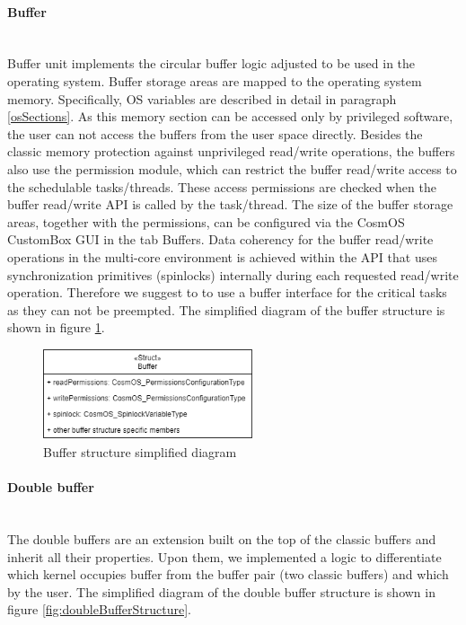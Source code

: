 \paragraph{Buffer}\mbox{}\\
\indent Buffer unit implements the circular buffer logic adjusted to be used in the operating system. 
Buffer storage areas are mapped to the operating system memory. Specifically, \ac{OS} variables are described in detail in paragraph \ref{osSections}. As this memory section can be accessed only by privileged software, the user can not access the buffers from the user space directly. Besides the classic memory protection against unprivileged read/write operations, the buffers also use the permission module, which can restrict the buffer read/write access to the schedulable tasks/threads. These access permissions are checked when the buffer read/write \ac{API} is called by the task/thread. The size of the buffer storage areas, together with the permissions, can be configured via the CosmOS CustomBox \ac{GUI} in the tab Buffers. Data coherency for the buffer read/write operations in the multi-core environment is achieved within the \ac{API} that uses synchronization primitives (spinlocks) internally during each requested read/write operation. Therefore we suggest to to use a buffer interface for the critical tasks as they can not be preempted. The simplified diagram of the buffer structure is shown in figure \ref{fig:bufferStructure}.
\begin{figure}[H]
\begin{center}
\includegraphics[width=0.55\textwidth]{images/buffer_structure.png}
\caption{Buffer structure simplified diagram}
\label{fig:bufferStructure}
\end{center}
\end{figure}

\paragraph{Double buffer}\mbox{}\\
\indent The double buffers are an extension built on the top of the classic buffers and inherit all their properties. Upon them, we implemented a logic to differentiate which kernel occupies buffer from the buffer pair (two classic buffers) and which by the user. The simplified diagram of the double buffer structure is shown in figure \ref{fig:doubleBufferStructure}.

